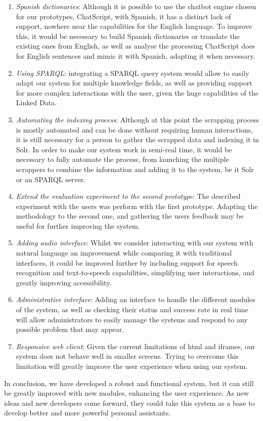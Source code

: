 \begin{enumerate}
 \item \emph{Spanish dictionaries}: Although it is possible to use the chatbot engine chosen for our prototypes, ChatScript, with Spanish, it has a distinct lack of support, nowhere near the capabilities for the English language. To improve this, it would be necessary to build Spanish dictionaries or translate the existing ones from English, as well as analyse the processing ChatScript does for English sentences and mimic it with Spanish, adapting it when necessary.
 \item \emph{Using SPARQL}: integrating a SPARQL query system would allow to easily adapt our system for multiple knowledge fields, as well as providing support for more complex interactions with the user, given the huge capabilities of the Linked Data.
 \item \emph{Automating the indexing process}: Although at this point the scrapping process is mostly automated and can be done without requiring human interactions, it is still necessary for a person to gather the scrapped data and indexing it in Solr. In order to make our system work in semi-real time, it would be necessary to fully automate the process, from launching the multiple scrappers to combine the information and adding it to the system, be it Solr or an SPARQL server.
 \item \emph{Extend the evaluation experiment to the second prototype}: The described experiment with the users was perform with the first prototype. Adapting the methodology to the second one, and gathering the users feedback may be useful for further improving the system.
 \item \emph{Adding audio interface}: Whilst we consider interacting with our system with natural language an improvement while comparing it with traditional interfaces, it could be improved further by including support for speech recognition and text-to-speech capabilities, simplifying user interactions, and greatly improving accessibility.
 \item \emph{Administrative interface}: Adding an interface to handle the different modules of the system, as well as checking their status and success rate in real time will allow administrators to easily manage the systems and respond to any possible problem that may appear.
 \item \emph{Responsive web client}: Given the current limitations of html and iframes, our system does not behave well in smaller screens. Trying to overcome this limitation will greatly improve the user experience when using our system.
\end{enumerate}

In conclusion, we have developed a robust and functional system, but it can still be greatly improved with new modules, enhancing the user experience. As new ideas and new developers come forward, they could take this system as a base to develop better and more powerful personal assistants.